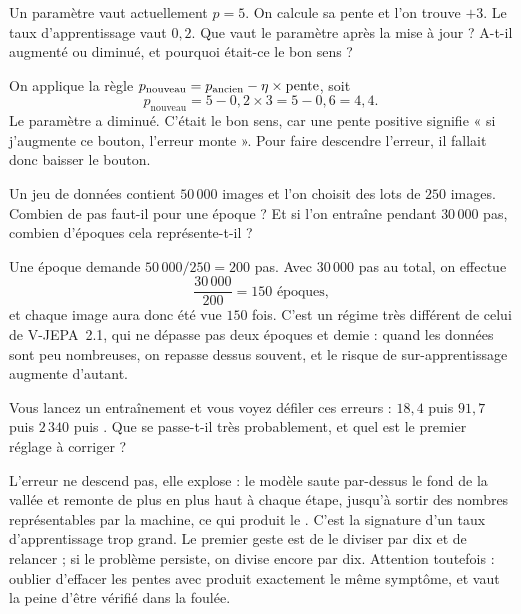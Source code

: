 \begin{exercice}
Un paramètre vaut actuellement $p = 5$. On calcule sa pente et l'on trouve
$+3$. Le taux d'apprentissage vaut $0{,}2$. Que vaut le paramètre après la
mise à jour ? A-t-il augmenté ou diminué, et pourquoi était-ce le bon sens ?
\end{exercice}

\begin{solution}
On applique la règle $p_{\text{nouveau}} = p_{\text{ancien}} - \eta \times
\text{pente}$, soit
\[
  p_{\text{nouveau}} = 5 - 0{,}2 \times 3 = 5 - 0{,}6 = 4{,}4 .
\]
Le paramètre a diminué. C'était le bon sens, car une pente positive signifie
« si j'augmente ce bouton, l'erreur monte ». Pour faire descendre l'erreur,
il fallait donc baisser le bouton.
\end{solution}

\begin{exercice}
Un jeu de données contient $50\,000$ images et l'on choisit des lots de
$250$ images. Combien de pas faut-il pour une époque ? Et si l'on entraîne
pendant $30\,000$ pas, combien d'époques cela représente-t-il ?
\end{exercice}

\begin{solution}
Une époque demande $50\,000 / 250 = 200$ pas. Avec $30\,000$ pas au total,
on effectue
\[
  \frac{30\,000}{200} = 150 \text{ époques,}
\]
et chaque image aura donc été vue $150$ fois. C'est un régime très différent
de celui de V-JEPA~2.1, qui ne dépasse pas deux époques et demie : quand les
données sont peu nombreuses, on repasse dessus souvent, et le risque de
sur-apprentissage augmente d'autant.
\end{solution}

\begin{exercice}
Vous lancez un entraînement et vous voyez défiler ces erreurs :
$18{,}4$ puis $91{,}7$ puis $2\,340$ puis . Que se passe-t-il
très probablement, et quel est le premier réglage à corriger ?
\end{exercice}

\begin{solution}
L'erreur ne descend pas, elle explose : le modèle saute par-dessus le fond
de la vallée et remonte de plus en plus haut à chaque étape, jusqu'à sortir
des nombres représentables par la machine, ce qui produit le
. C'est la signature d'un taux d'apprentissage trop grand.
Le premier geste est de le diviser par dix et de relancer ; si le problème
persiste, on divise encore par dix. Attention toutefois : oublier
d'effacer les pentes avec  produit exactement le même
symptôme, et vaut la peine d'être vérifié dans la foulée.
\end{solution}

